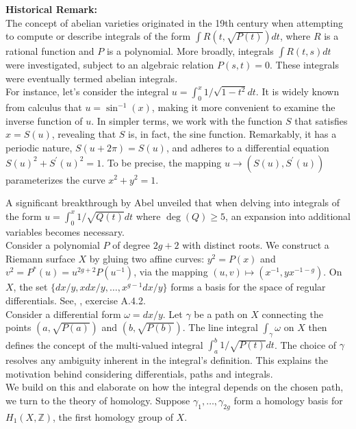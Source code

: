 \textbf{Historical Remark:}\\
The concept of abelian varieties originated in the 19th century when attempting to compute or describe integrals of the form $\int R(t, \sqrt{P(t)}) d t$, where $R$ is a rational function and $P$ is a polynomial. More broadly, integrals $\int R(t, s) d t$ were investigated, subject to an algebraic relation $P(s, t)=0$. These integrals were eventually termed abelian integrals.\\

For instance, let's consider the integral $u=\int_{0}^{x} 1 / \sqrt{1-t^{2}} d t$. It is widely known from calculus that $u=\sin ^{-1}(x)$, making it more convenient to examine the inverse function of $u$. In simpler terms, we work with the function $S$ that satisfies $x=S(u)$, revealing that $S$ is, in fact, the sine function. Remarkably, it has a periodic nature, $S(u+2 \pi)=S(u)$, and adheres to a differential equation $S(u)^{2}+S^{\prime}(u)^{2}=1$. To be precise, the mapping $u \rightarrow\left(S(u), S^{\prime}(u)\right)$ parameterizes the curve $x^{2}+y^{2}=1$.


A significant breakthrough by Abel unveiled that when delving into integrals of the form $u=\int_{0}^{x} 1 / \sqrt{Q(t)} d t$ where $\operatorname{deg}(Q) \geq 5$, an expansion into additional variables becomes necessary. \\

Consider a polynomial \( P \) of degree \( 2g + 2 \) with distinct roots. We construct a Riemann surface \( X \) by gluing two affine curves: \( y^2 = P(x) \) and \( v^2 = P^*(u) = u^{2g + 2}P(u^{-1}) \), via the mapping \( (u, v) \mapsto (x^{-1}, yx^{-1-g}) \). On \( X \), the set \( \{dx/y, xdx/y, \ldots, x^{g-1}dx/y\} \) forms a basis for the space of regular differentials. See, \cite{hindry-silverman-diophantine}, exercise A.4.2. \\

Consider a differential form \( \omega = dx/y \). Let \( \gamma \) be a path on \( X \) connecting the points \( (a, \sqrt{P(a)}) \) and \( (b, \sqrt{P(b)}) \). The line integral \( \int_\gamma \omega \) on \( X \) then defines the concept of the multi-valued integral \( \int_a^b 1/\sqrt{P(t)} dt \). The choice of \( \gamma \) resolves any ambiguity inherent in the integral's definition. This explains the motivation behind considering differentials, paths and integrals. \\


We build on this and elaborate on how the integral depends on the chosen path, we turn to the theory of homology. Suppose \( \gamma_1, \ldots, \gamma_{2g} \) form a homology basis for \( H_1(X, \mathbb{Z}) \), the first homology group of \( X \). \\

